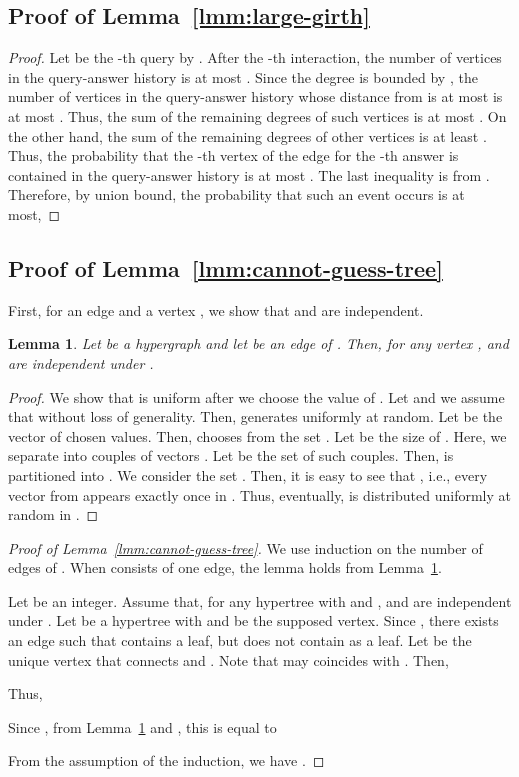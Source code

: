 \documentclass[letterpaper,11pt]{article}
\newtheorem{lemma}[theorem]{Lemma}
\begin{document}
\subsection{Proof of Lemma~\ref{lmm:large-girth}}\label{apx:large-girth}
\begin{proof}
  Let  be the -th query by .
  After the -th interaction,
  the number of vertices in the query-answer history is at most .
  Since the degree is bounded by ,
  the number of vertices in the query-answer history whose distance from  is at most  is at most .
  Thus, the sum of the remaining degrees of such vertices is at most .
  On the other hand, the sum of the remaining degrees of other vertices is at least .
  Thus, the probability that the -th vertex  of the edge for the -th answer is contained in the query-answer history is at most .
  The last inequality is from .
  Therefore, by union bound, the probability that such an event occurs is at most,
  
\end{proof}


\subsection{Proof of Lemma~\ref{lmm:cannot-guess-tree}}\label{apx:cannot-guess-tree}
First, for an edge  and a vertex ,
we show that  and  are independent.
\begin{lemma}\label{lmm:cannot-guess-edge}
  Let  be a hypergraph and let  be an edge of .
  Then, for any vertex ,  and  are independent under .
\end{lemma}
\begin{proof}
  We show that  is uniform after we choose the value of .
  Let  and we assume that  without loss of generality.
  Then,  generates  uniformly at random.
  Let  be the vector of chosen values.
  Then,  chooses  from the set .
  Let  be the size of .
  Here, we separate  into  couples of vectors .
  Let  be the set of such couples.
  Then,  is partitioned into .
  We consider the set .
  Then, it is easy to see that , i.e., every vector from  appears exactly once in .
  Thus, eventually,  is distributed uniformly at random in .
\end{proof}

\begin{proof}[Proof of Lemma~\ref{lmm:cannot-guess-tree}]
  We use induction on the number of edges of .
  When  consists of one edge, 
  the lemma holds from Lemma~\ref{lmm:cannot-guess-edge}.

  Let  be an integer.
  Assume that, 
  for any hypertree  with  and ,
   and  are independent under .
  Let  be a hypertree with  and  be the supposed vertex.
  Since ,
  there exists an edge  such that  contains a leaf,
  but does not contain  as a leaf.
  Let  be the unique vertex that connects  and .
  Note that  may coincides with .
  Then, 
  
  Thus, 
  
  Since ,  from Lemma~\ref{lmm:cannot-guess-edge} and , this is equal to
  
  From the assumption of the induction, we have .
\end{proof}
\end{document}
